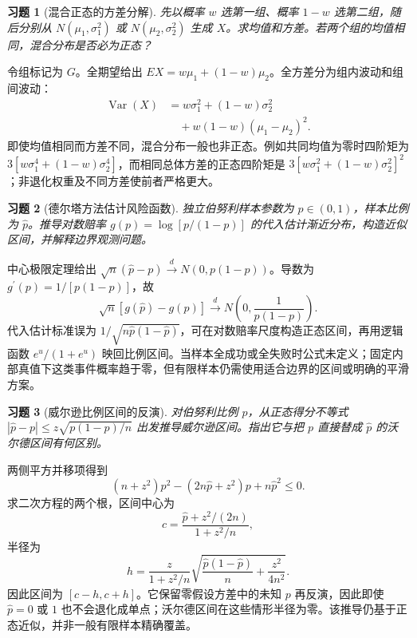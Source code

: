 \documentclass[UTF8,12pt,a4paper,fontset=fandol]{ctexart}
\newtheorem{exercise}{习题}[section]
\begin{document}
\begin{exercise}[混合正态的方差分解]\label{q:B17.9}
先以概率 $w$ 选第一组、概率 $1-w$ 选第二组，随后分别从 $N(\mu_1,\sigma_1^2)$ 或 $N(\mu_2,\sigma_2^2)$ 生成 $X$。求均值和方差。若两个组的均值相同，混合分布是否必为正态？\par{}
\end{exercise}

\begin{solve}\label{a:B17.9}令组标记为 $G$。全期望给出 $EX=w\mu_1+(1-w)\mu_2$。全方差分为组内波动和组间波动：\[\begin{aligned}\operatorname{Var}(X)&=w\sigma_1^2+(1-w)\sigma_2^2\\&\quad+w(1-w)(\mu_1-\mu_2)^2.\end{aligned}\]即使均值相同而方差不同，混合分布一般也非正态。例如共同均值为零时四阶矩为 $3[w\sigma_1^4+(1-w)\sigma_2^4]$，而相同总体方差的正态四阶矩是 $3[w\sigma_1^2+(1-w)\sigma_2^2]^2$；非退化权重及不同方差使前者严格更大。\end{solve}

\begin{exercise}[德尔塔方法估计风险函数]\label{q:B17.10}
独立伯努利样本参数为 $p\in(0,1)$，样本比例为 $\widehat p$。推导对数赔率 $g(p)=\log[p/(1-p)]$ 的代入估计渐近分布，构造近似区间，并解释边界观测问题。\par{}
\end{exercise}

\begin{solve}\label{a:B17.10}中心极限定理给出 $\sqrt n(\widehat p-p)\xrightarrow dN(0,p(1-p))$。导数为 $g^{\prime}(p)=1/[p(1-p)]$，故\[\sqrt n[g(\widehat p)-g(p)]\xrightarrow dN\left(0,\frac1{p(1-p)}\right).\]代入估计标准误为 $1/\sqrt{n\widehat p(1-\widehat p)}$，可在对数赔率尺度构造正态区间，再用逻辑函数 $e^u/(1+e^u)$ 映回比例区间。当样本全成功或全失败时公式未定义；固定内部真值下这类事件概率趋于零，但有限样本仍需使用适合边界的区间或明确的平滑方案。\end{solve}

\begin{exercise}[威尔逊比例区间的反演]\label{q:B17.11}
对伯努利比例 $p$，从正态得分不等式 $|\widehat p-p|\le z\sqrt{p(1-p)/n}$ 出发推导威尔逊区间。指出它与把 $p$ 直接替成 $\widehat p$ 的沃尔德区间有何区别。\par{}
\end{exercise}

\begin{solve}\label{a:B17.11}两侧平方并移项得到\[(n+z^2)p^2-(2n\widehat p+z^2)p+n\widehat p^2\le0.\]求二次方程的两个根，区间中心为\[c=\frac{\widehat p+z^2/(2n)}{1+z^2/n},\]半径为\[h=\frac{z}{1+z^2/n}\sqrt{\frac{\widehat p(1-\widehat p)}n+\frac{z^2}{4n^2}}.\]因此区间为 $[c-h,c+h]$。它保留零假设方差中的未知 $p$ 再反演，因此即使 $\widehat p=0$ 或 $1$ 也不会退化成单点；沃尔德区间在这些情形半径为零。该推导仍基于正态近似，并非一般有限样本精确覆盖。\end{solve}
\end{document}
